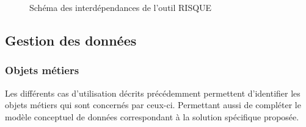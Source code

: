 \begin{figure}[H]
    \label{fig-dep-risque}
    \noindent{}
    \caption{Schéma des interdépendances de l'outil RISQUE}
\end{figure}

\subsection{Gestion des données}

\subsubsection{Objets métiers}

Les différents cas d’utilisation décrits précédemment permettent d’identifier les objets métiers qui sont concernés par ceux-ci. Permettant aussi de compléter le modèle conceptuel de données correspondant à la solution spécifique proposée.

